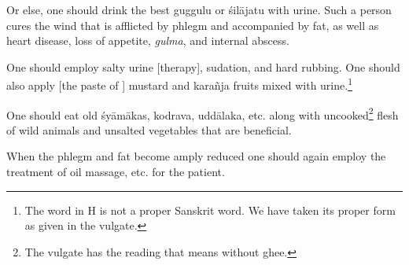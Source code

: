 \begin{translation}
\begin{tt}
\item[35-38]

\begin{sloka}
Or else, one should drink the best \gls{guggulu} or \gls{śilājatu}
with urine. Such a person cures the wind that is afflicted by phlegm
and accompanied by fat, as well as heart disease, loss of appetite,
\textit{gulma}, and internal abscess.

One should employ salty urine [therapy], sudation, and hard rubbing.
One should also apply [the paste of ] mustard and \gls{karañja} fruits
mixed with urine.\footnote{The word  in H is not a proper
    Sanskrit word. We have taken its proper form  as given in
    the vulgate.}

One should eat old \gls{śyāmāka}s, \gls{kodrava}, \gls{uddālaka}, etc.
along with uncooked\footnote{The vulgate has the reading
     that means without ghee.} flesh of wild animals and
    unsalted vegetables that are beneficial.
\end{sloka}

\item[39]

\begin{sloka}
When the phlegm and fat become amply reduced one should again employ
the treatment of oil massage, etc. for the patient.
\end{sloka}
\end{tt}

\end{translation}
